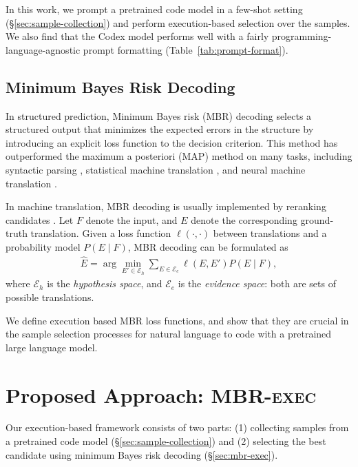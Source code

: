 \documentclass[11pt]{article}
\newcommand{\interalia}[1]{\citep[\textit{inter alia}]{#1}}
\newcommand{\mbrexec}{\textsc{MBR-exec}\xspace}
\begin{document}
In this work, we prompt a pretrained code model \citep[Codex;][]{chen2021evaluating} in a few-shot setting (\S\ref{sec:sample-collection}) and perform execution-based selection over the samples. We also find that the Codex model performs well with a fairly programming-language-agnostic prompt formatting (Table~\ref{tab:prompt-format}). 

\subsection{Minimum Bayes Risk Decoding}
In structured prediction, Minimum Bayes risk (MBR) decoding \citep{bickel1977mathematical} selects a structured output that minimizes the expected errors in the structure by introducing an explicit loss function to the decision criterion. This method has outperformed the maximum a posteriori (MAP) method on many tasks, including syntactic parsing \citep{titov2006bayes,shi-etal-2019-visually,zhang-etal-2020-efficient}, statistical machine translation \citep{kumar-byrne-2004-minimum,zhang-gildea-2008-efficient}, and neural machine translation \citep{eikema-aziz-2020-map,eikema2021sampling}. 

In machine translation, MBR decoding is usually implemented by reranking candidates \interalia{goel-byrne-2000-minimum, kumar-byrne-2004-minimum, tromble-etal-2008-lattice}. Let $F$ denote the input, and $E$ denote the corresponding ground-truth translation. Given a loss function $\ell(\cdot, \cdot)$ between translations and a probability model $P(E\mid F)$, MBR decoding can be formulated as 
\begin{align}
    \hat{E} = \arg\min_{E'\in \mathcal{E}_h} \sum_{E\in\mathcal{E}_e} \ell(E, E') P(E\mid F),
    \label{eq:mbr-decoding}
\end{align}
where $\mathcal{E}_h$ is the \textit{hypothesis space}, and $\mathcal{E}_e$ is the \textit{evidence space}: both are sets of possible translations. 

We define execution based MBR loss functions, and show that they are crucial in the sample selection processes for natural language to code with a pretrained large language model. 
 
\section{Proposed Approach: \mbrexec}
Our execution-based framework consists of two parts: (1) collecting samples from a pretrained code model (\S\ref{sec:sample-collection}) and (2) selecting the best candidate using minimum Bayes risk decoding (\S\ref{sec:mbr-exec}).
\end{document}
